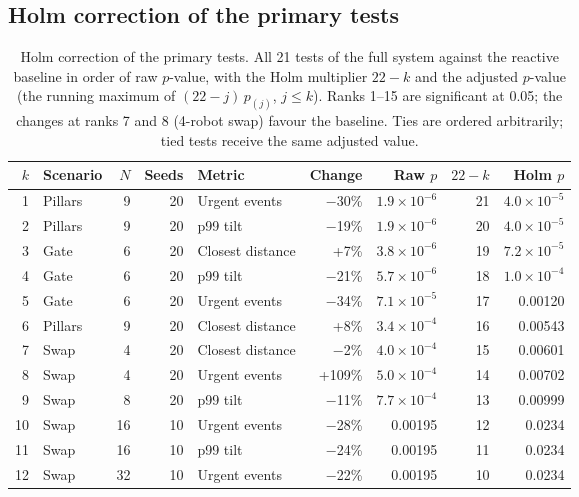 \documentclass[pdflatex,sn-mathphys-num]{sn-jnl}
\begin{document}
\begin{appendices}

\section{Holm correction of the primary tests}\label{app:holm}

\begin{table}[!htbp]
  \centering
  \caption{Holm correction of the primary tests. All 21 tests of the full system against the reactive
  baseline in order of raw $p$-value, with the Holm multiplier $22-k$ and the adjusted $p$-value (the running
  maximum of $(22-j)\,p_{(j)}$, $j \le k$). Ranks 1--15 are significant at 0.05; the changes at ranks 7 and 8
  (4-robot swap) favour the baseline. Ties are ordered arbitrarily; tied tests receive the same adjusted
  value.}
  \label{tab:holm}
  \footnotesize
  \begin{tabular}{@{}rlrrlrrrr@{}}
    \toprule
    $k$ & Scenario & $N$ & Seeds & Metric & Change & Raw $p$ & $22-k$ & Holm $p$ \\
    \midrule
    1 & Pillars & 9 & 20 & Urgent events & $-$30\% & $1.9\times10^{-6}$ & 21 & $4.0\times10^{-5}$ \\
    2 & Pillars & 9 & 20 & p99 tilt & $-$19\% & $1.9\times10^{-6}$ & 20 & $4.0\times10^{-5}$ \\
    3 & Gate & 6 & 20 & Closest distance & +7\% & $3.8\times10^{-6}$ & 19 & $7.2\times10^{-5}$ \\
    4 & Gate & 6 & 20 & p99 tilt & $-$21\% & $5.7\times10^{-6}$ & 18 & $1.0\times10^{-4}$ \\
    5 & Gate & 6 & 20 & Urgent events & $-$34\% & $7.1\times10^{-5}$ & 17 & 0.00120 \\
    6 & Pillars & 9 & 20 & Closest distance & +8\% & $3.4\times10^{-4}$ & 16 & 0.00543 \\
    7 & Swap & 4 & 20 & Closest distance & $-$2\% & $4.0\times10^{-4}$ & 15 & 0.00601 \\
    8 & Swap & 4 & 20 & Urgent events & +109\% & $5.0\times10^{-4}$ & 14 & 0.00702 \\
    9 & Swap & 8 & 20 & p99 tilt & $-$11\% & $7.7\times10^{-4}$ & 13 & 0.00999 \\
    10 & Swap & 16 & 10 & Urgent events & $-$28\% & 0.00195 & 12 & 0.0234 \\
    11 & Swap & 16 & 10 & p99 tilt & $-$24\% & 0.00195 & 11 & 0.0234 \\
    12 & Swap & 32 & 10 & Urgent events & $-$22\% & 0.00195 & 10 & 0.0234 \\

\end{tabular}
\end{table}
\end{appendices}
\end{document}

